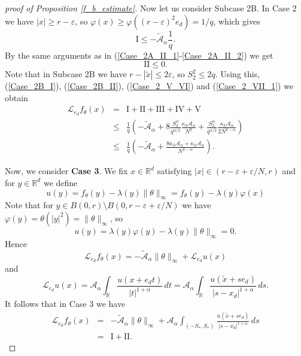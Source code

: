 \documentclass[a4paper,12pt,reqno]{amsart}
\theoremstyle{definition}
\theoremstyle{remark}
\newcommand{\eps}{\varepsilon}
\newcommand{\calA}{\mathcal{A}}
\newcommand{\calL}{\mathcal{L}}
\newcommand{\R}{\mathds{R}}
\begin{document}
\begin{proof}[proof of Proposition \ref{f_b_estimate}]
Now let us consider Subcase 2B. 
%
In Case 2 we have $|x| \ge r - \eps$, so $\varphi(x) \ge \varphi((r - \eps)^2 e_d) = 1/q$, which gives  
\begin{equation}
\label{Case_2B_I}
\text{I} \le - \tilde{\calA}_{\alpha}  \frac{1}{q} .
\end{equation} 
By the same arguments as in (\ref{Case_2A_II_1}-\ref{Case_2A_II_2}) we get 
\begin{equation}
\label{Case_2B_II}
\text{II} \le 0.
\end{equation} 
Note that in Subcase 2B we have $r - |\tilde{x}| \le 2 \eps$, so ${S_2^2} \le 2 q$. Using this, (\ref{Case_2B_I}), (\ref{Case_2B_II}), (\ref{Case_2_V_VI}) and (\ref{Case_2_VII_1}) we obtain
\begin{eqnarray}
\nonumber
\calL_{e_d} f_{\theta}(x) &=&  \text{I} + \text{II} + \text{III} + \text{IV} + \text{V}\\
\nonumber
&\le&
\frac{1}{q }
\left(- {\tilde{\calA}_{\alpha} } + 8\frac{S_2^\alpha}{q^{\alpha/2}}\frac{ \kappa_3 \calA_{\alpha} }{N^2} + 
\frac{S_2^\alpha}{q^{\alpha/2}}\frac{\kappa_2 \calA_{\alpha} }{2 N^{2 - \alpha}}\right)\\
&\le& 
\label{Case_2B_I_II_V_VI_VII_2}
\frac1{q}
\left(- \tilde{\calA}_{\alpha} + \frac{8 \kappa_3 \calA_{\alpha} + \kappa_2 \calA_{\alpha}}{N^{2 - \alpha}}
\right).
\end{eqnarray}

\vskip 2pt
Now, we consider {\bf Case 3}. 
We fix $x \in \R^d$ satisfying $|x| \in (r - \eps + \eps/N, r)$ and for $y \in \R^d$ we define
$$
u(y) = f_{\theta}(y) - \lambda(y) \|\theta\|_{\infty}= f_{\theta}(y) - \lambda(y) \varphi(x)
$$
Note that for $y \in B(0,r) \setminus B(0, r - \eps + \eps/N)$ we have $\varphi(y) = \theta(|y|^2) = \|\theta\|_{\infty}$, so
$$
u(y) = \lambda(y) \varphi(y) - \lambda(y) \|\theta\|_{\infty} = 0.
$$
Hence
$$
\calL_{e_d} f_{\theta}(x) = - \tilde{\calA}_{\alpha}  \|\theta\|_{\infty}
+ \calL_{e_d} u(x)
$$
and
$$
\calL_{e_d} u(x) = 
\calA_{\alpha}  \int_{\R} \frac{u(x + e_d t)}{|t|^{1 + \alpha}} \, dt
= \calA_{\alpha} \int_{\R} \frac{u(\tilde{x} +s e_d)}{|s - x_d|^{1+\alpha}} \, ds. 
$$
It follows that in Case 3 we have
\begin{eqnarray*}
\calL_{e_d} f_{\theta}(x) &=& - \tilde{\calA}_{\alpha}  \|\theta\|_{\infty}
+ \calA_{\alpha} \int_{(-S_*,S_*)} \frac{u(\tilde{x} +s e_d)}{|s - x_d|^{1+\alpha}} \, ds\\
&=& \text{I} + \text{II}.
\end{eqnarray*}


\end{proof}
\end{document}
